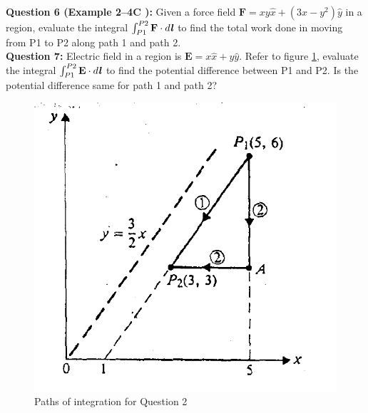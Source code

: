\documentclass[12pt,a4paper]{article}
\begin{document}
\newpage
\noindent\textbf{Question 6 (Example 2--4C \cite[Example 2--4, page 23]{Cheng}):} Given a force field $\textbf{F}=xy\hat x+(3x-y^2)\hat y$ in a region, evaluate the integral $\int_{P1}^{P2}\textbf{F}\cdot d\textbf{\textit{l}}$ to find the total work done in moving from P1 to P2 along path 1 and path 2.\\[0.2cm]
\noindent\textbf{Question 7:} Electric field in a region is $\textbf{E}=x\hat x+y\hat y$. Refer to figure \ref{Cheng-integral}, evaluate the integral $\int_{P1}^{P2}\textbf{E}\cdot d\textbf{\textit{l}}$ to find the potential difference between P1 and P2. Is the potential difference same for path 1 and path 2?
\begin{figure}[H]
\centering
\includegraphics[scale=0.6]{Figure2-10Cheng.png}
\caption{Paths of integration for Question 2 \cite[Figure 2--10, page 23]{Cheng}}
\label{Cheng-integral}
\end{figure}


\end{document}
